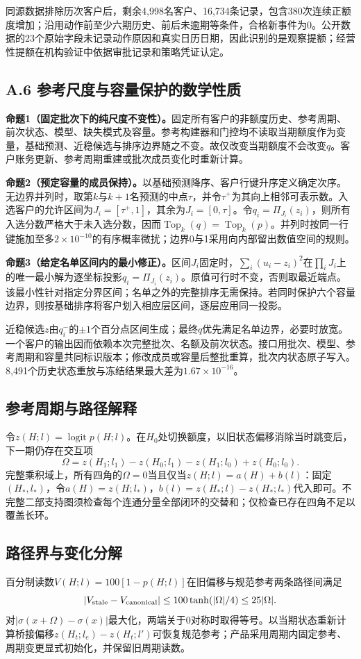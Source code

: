同源数据排除历次客户后，剩余4,998名客户、16,734条记录，包含380次连续正额度增加；沿用动作前至少六期历史、前后未逾期等条件，合格新事件为0。公开数据的23个原始字段未记录动作原因和真实日历日期，因此识别的是观察提额；经营性提额在机构验证中依据审批记录和策略凭证认定。

\clearpage\subsection*{A.6 参考尺度与容量保护的数学性质}
\textbf{命题1（固定批次下的纯尺度不变性）。}固定所有客户的非额度历史、参考周期、前次状态、模型、缺失模式及容量。参考构建器和门控均不读取当期额度作为变量，基础预测、近稳候选与排序边界随之不变。故仅改变当期额度不会改变$q$。客户账务更新、参考周期重建或批次成员变化时重新计算。

\textbf{命题2（预定容量的成员保持）。}以基础预测降序、客户行键升序定义确定次序。无边界并列时，取第$k$与$k+1$名预测的中点$\tau$，并令$\tau^+$为其向上相邻可表示数。入选客户的允许区间为$J_i=[\tau^+,1]$，其余为$J_i=[0,\tau]$。令$q_i=\Pi_{J_i}(z_i)$，则所有入选分数严格大于未入选分数，因而$\operatorname{Top}_k(q)=\operatorname{Top}_k(p)$。并列时按同一行键施加至多$2\times10^{-10}$的有序概率微扰；边界0与1采用向内部留出数值空间的规则。

\textbf{命题3（给定名单区间内的最小修正）。}区间$J_i$固定时，$\sum_i(u_i-z_i)^2$在$\prod_iJ_i$上的唯一最小解为逐坐标投影$q_i=\Pi_{J_i}(z_i)$。原值可行时不变，否则取最近端点。该最小性针对指定分界区间；名单之外的完整排序无需保持。若同时保护六个容量边界，则按基础排序将客户划入相应层区间，逐层应用同一投影。

近稳候选$z$由$q_i^-$的$\pm1$个百分点区间生成；最终$q$优先满足名单边界，必要时放宽。一个客户的输出因而依赖本次完整批次、名额及前次状态。接口用批次、模型、参考周期和容量共同标识版本；修改成员或容量后整批重算，批次内状态原子写入。8,491个历史状态重放与冻结结果最大差为$1.67\times10^{-16}$。

\subsection*{参考周期与路径解释}
令$z(H;l)=\operatorname{logit}p(H;l)$。在$H_0$处切换额度，以旧状态偏移消除当时跳变后，下一期仍存在交互项
\[
\Omega=z(H_1;l_1)-z(H_0;l_1)-z(H_1;l_0)+z(H_0;l_0).
\]
完整乘积域上，所有四角的$\Omega=0$当且仅当$z(H;l)=a(H)+b(l)$：固定$(H_*,l_*)$，令$a(H)=z(H;l_*)$，$b(l)=z(H_*;l)-z(H_*;l_*)$代入即可。不完整二部支持图须检查每个连通分量全部闭环的交替和；仅检查已存在四角不足以覆盖长环。

\subsection*{路径界与变化分解}
百分制读数$V(H;l)=100[1-p(H;l)]$在旧偏移与规范参考两条路径间满足
\[
|V_{\rm stale}-V_{\rm canonical}|\leq100\tanh(|\Omega|/4)\leq25|\Omega|.
\]
对$|\sigma(x+\Omega)-\sigma(x)|$最大化，两端关于0对称时取得等号。以当期状态重新计算桥接偏移$z(H_t;l_e)-z(H_t;l')$可恢复规范参考；产品采用周期内固定参考、周期变更显式初始化，并保留旧周期读数。

